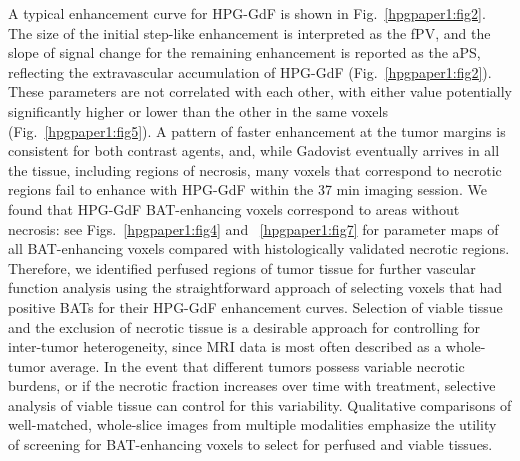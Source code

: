 A typical enhancement curve for HPG-GdF is shown in Fig.~\ref{hpgpaper1:fig2}.
The size of the initial step-like enhancement is interpreted as the fPV, and the slope of signal change for the remaining enhancement is reported as the aPS, reflecting the extravascular accumulation of HPG-GdF (Fig.~\ref{hpgpaper1:fig2}).
These parameters are not correlated with each other, with either value potentially significantly higher or lower than the other in the same voxels (Fig.~\ref{hpgpaper1:fig5}).
A pattern of faster enhancement at the tumor margins is consistent for both contrast agents, and, while Gadovist eventually arrives in all the tissue, including regions of necrosis, many voxels that correspond to necrotic regions fail to enhance with HPG-GdF within the 37 min imaging session.
We found that HPG-GdF BAT-enhancing voxels correspond to areas without necrosis: see Figs.~\ref{hpgpaper1:fig4} and ~\ref{hpgpaper1:fig7} for parameter maps of all BAT-enhancing voxels compared with histologically validated necrotic regions.
Therefore, we identified perfused regions of tumor tissue for further vascular function analysis using the straightforward approach of selecting voxels that had positive BATs for their HPG-GdF enhancement curves.
Selection of viable tissue and the exclusion of necrotic tissue is a desirable approach for controlling for inter-tumor heterogeneity, since MRI data is most often described as a whole-tumor average.
In the event that different tumors possess variable necrotic burdens, or if the necrotic fraction increases over time with treatment, selective analysis of viable tissue can control for this variability.
Qualitative comparisons of well-matched, whole-slice images from multiple modalities emphasize the utility of screening for BAT-enhancing voxels to select for perfused and viable tissues.

